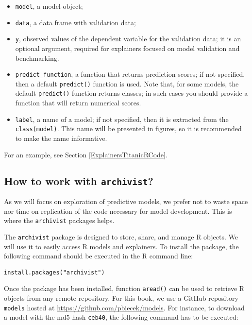 \documentclass[12pt,]{krantz}
\providecommand{\tightlist}{%
  \setlength{\itemsep}{0pt}\setlength{\parskip}{0pt}}
\begin{document}
\begin{itemize}
\tightlist
\item
  \texttt{model}, a model-object;
\item
  \texttt{data}, a data frame with validation data;
\item
  \texttt{y}, observed values of the dependent variable for the validation data; it is an optional argument, required for explainers focused on model validation and benchmarking.
\item
  \texttt{predict\_function}, a function that returns prediction scores; if not specified, then a default \texttt{predict()} function is used. Note that, for some models, the default \texttt{predict()} function returns classes; in such cases you should provide a function that will return numerical scores.
\item
  \texttt{label}, a name of a model; if not specified, then it is extracted from the \texttt{class(model)}. This name will be presented in figures, so it is recommended to make the name informative.
\end{itemize}

For an example, see Section \ref{ExplainersTitanicRCode}.

\hypertarget{how-to-work-with-archivist}{%
\subsection{\texorpdfstring{How to work with \texttt{archivist}?}{How to work with archivist?}}\label{how-to-work-with-archivist}}

As we will focus on exploration of predictive models, we prefer not to waste space nor time on replication of the code necessary for model development. This is where the \texttt{archivist} packages helps.

The \texttt{archivist} package \citep{archivist} is designed to store, share, and manage R objects. We will use it to easily access R models and explainers. To install the package, the following command should be executed in the R command line:

\begin{verbatim}
install.packages("archivist")
\end{verbatim}

Once the package has been installed, function \texttt{aread()} can be used to retrieve R objects from any remote repository. For this book, we use a GitHub repository \texttt{models} hosted at \url{https://github.com/pbiecek/models}. For instance, to download a model with the md5 hash \texttt{ceb40}, the following command has to be executed:
\end{document}
